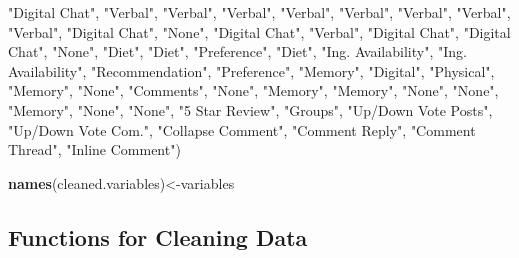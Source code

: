 \documentclass[
]{article}
\newenvironment{Shaded}{\begin{snugshade}}{\end{snugshade}}
\newcommand{\KeywordTok}[1]{\textcolor[rgb]{0.13,0.29,0.53}{\textbf{#1}}}
\newcommand{\NormalTok}[1]{#1}
\newcommand{\StringTok}[1]{\textcolor[rgb]{0.31,0.60,0.02}{#1}}
\begin{document}
\begin{Shaded}
\begin{Highlighting}[]
  \StringTok{"Digital Chat"}\NormalTok{,}
  \StringTok{"Verbal"}\NormalTok{,}
  \StringTok{"Verbal"}\NormalTok{,}
  \StringTok{"Verbal"}\NormalTok{,}
  \StringTok{"Verbal"}\NormalTok{,}
  \StringTok{"Verbal"}\NormalTok{,}
  \StringTok{"Verbal"}\NormalTok{,}
  \StringTok{"Verbal"}\NormalTok{,}
  \StringTok{"Verbal"}\NormalTok{,}
  \StringTok{"Digital Chat"}\NormalTok{,}
  \StringTok{"None"}\NormalTok{,}
  \StringTok{"Digital Chat"}\NormalTok{,}
  \StringTok{"Verbal"}\NormalTok{,}
  \StringTok{"Digital Chat"}\NormalTok{,}
  \StringTok{"Digital Chat"}\NormalTok{,}
  \StringTok{"None"}\NormalTok{,}
  \StringTok{"Diet"}\NormalTok{,}
  \StringTok{"Diet"}\NormalTok{,}
  \StringTok{"Preference"}\NormalTok{,}
  \StringTok{"Diet"}\NormalTok{,}
  \StringTok{"Ing. Availability"}\NormalTok{,}
  \StringTok{"Ing. Availability"}\NormalTok{,}
  \StringTok{"Recommendation"}\NormalTok{,}
  \StringTok{"Preference"}\NormalTok{,}
  \StringTok{"Memory"}\NormalTok{,}
  \StringTok{"Digital"}\NormalTok{,}
  \StringTok{"Physical"}\NormalTok{,}
  \StringTok{"Memory"}\NormalTok{,}
  \StringTok{"None"}\NormalTok{,}
  \StringTok{"Comments"}\NormalTok{,}
  \StringTok{"None"}\NormalTok{,}
  \StringTok{"Memory"}\NormalTok{,}
  \StringTok{"Memory"}\NormalTok{,}
  \StringTok{"None"}\NormalTok{,}
  \StringTok{"None"}\NormalTok{,}
  \StringTok{"Memory"}\NormalTok{,}
  \StringTok{"None"}\NormalTok{,}
  \StringTok{"None"}\NormalTok{,}
  \StringTok{"5 Star Review"}\NormalTok{,}
  \StringTok{"Groups"}\NormalTok{,}
  \StringTok{"Up/Down Vote Posts"}\NormalTok{,}
  \StringTok{"Up/Down Vote Com."}\NormalTok{,}
  \StringTok{"Collapse Comment"}\NormalTok{,}
  \StringTok{"Comment Reply"}\NormalTok{,}
  \StringTok{"Comment Thread"}\NormalTok{,}
  \StringTok{"Inline Comment"}\NormalTok{)}

\KeywordTok{names}\NormalTok{(cleaned.variables)<-variables}
\end{Highlighting}
\end{Shaded}

\hypertarget{functions-for-cleaning-data}{%
\subsection{Functions for Cleaning
Data}\label{functions-for-cleaning-data}}
\end{document}
